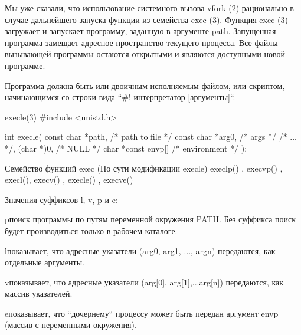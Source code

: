 Мы уже сказали, что использование системного вызова vfork (2) рационально в случае дальнейшего запуска функции из семейства exec (3). Функция exec (3) загружает и запускает программу, заданную в аргументе path. Запущенная программа замещает адресное пространство текущего процесса. Все файлы вызывающей программы остаются открытыми и являются доступными новой программе.

Программа должна быть или двоичным исполняемым файлом, или скриптом, начинающимся со строки вида “\#! интерпретатор [аргументы]“. 

\begin{CCode}{execle(3)}
	#include <unistd.h>

	int execle( 
		const char *path, 	/* path to file */ 
		const char *arg0, 	/* args */ /* ... */, 
		(char *)0,			/* NULL */ 
		char *const envp[] 	/* environment */ 
	); \end{CCode}

Семейство функций exec (По сути модификации execle)
	execlp() , execvp() , execl(), execv() , execle() , execve() 
		
Значения суффиксов l, v, p и e:

\begin{myenv}{p}{поиск программы по путям переменной окружения PATH. Без суффикса поиск будет производиться только в рабочем каталоге.}
\end{myenv}

\begin{myenv}{l}{показывает, что адресные указатели (arg0, arg1, ..., argn) передаются, как отдельные аргументы.}
\end{myenv}

\begin{myenv}{v}{показывает,  что  адресные  указатели  (arg[0], arg[1],...arg[n]) передаются, как массив указателей.}
\end{myenv}

\begin{myenv}{e}{показывает, что “дочернему“ процессу может быть передан  аргумент   envp (массив с переменными окружения).}
\end{myenv}
